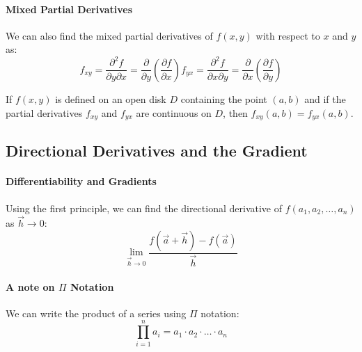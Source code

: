 \documentclass[11pt]{article}
\begin{document}
\paragraph{Mixed Partial Derivatives} We can also find the mixed partial derivatives of $f(x, y)$ with respect to $x$ and $y$ as:
\begin{subequations}
    \begin{equation}
    f_{xy} = \frac{\partial^2 f}{\partial y \partial x} = \frac{\partial}{\partial y} \left( \frac{\partial f}{\partial x} \right)
    \end{equation}
    \begin{equation}
    f_{yx} = \frac{\partial^2 f}{\partial x \partial y} = \frac{\partial}{\partial x} \left( \frac{\partial f}{\partial y} \right)
    \end{equation}
\end{subequations}
\begin{theorem}
    If $f(x, y)$ is defined on an open disk $D$ containing the point $(a, b)$ and if the partial derivatives $f_{xy}$ and $f_{yx}$ are continuous on $D$, then $f_{xy}(a, b) = f_{yx}(a, b)$.
\end{theorem}
\subsection{Directional Derivatives and the Gradient}
\paragraph{Differentiability and Gradients} Using the first principle, we can find the directional derivative of $f(a_1, a_2, \dots, a_n)$ as $\vec{h} \to 0$:
\begin{equation}
    \lim_{\vec{h} \to 0} \frac{f(\vec{a} + \vec{h}) - f(\vec{a})}{\vec{h}}
\end{equation}
\paragraph{A note on $\Pi$ Notation} We can write the product of a series using $\Pi$ notation:
\begin{equation}
    \prod_{i=1}^n a_i = a_1 \cdot a_2 \cdot \ldots \cdot a_n
\end{equation}
\appendix

\end{document}
